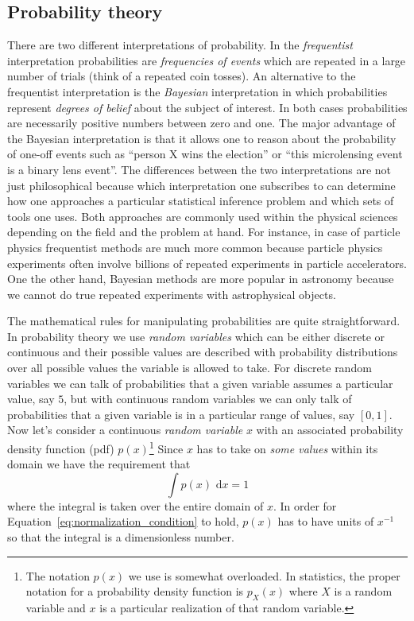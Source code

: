 \documentclass[12pt,dvipsnames]{report}
\newcommand{\ud}{\,\mathrm{d}}
\begin{document}
\subsection{Probability theory}
There are two different interpretations of probability. In the
\emph{frequentist} interpretation probabilities are \emph{frequencies of
    events} which are repeated in a large number of trials (think of a repeated
coin tosses). An alternative to the frequentist interpretation is the
\emph{Bayesian} interpretation in which probabilities represent \emph{degrees
    of belief} about the subject of interest. In both cases probabilities are
necessarily positive numbers between zero and one. The major advantage of the
Bayesian interpretation is that it allows one to reason about the probability
of one-off events such as ``person X wins the election'' or ``this microlensing
event is a binary lens event''. The differences between the two interpretations
are not just philosophical because which interpretation one subscribes to can
determine how one approaches a particular statistical inference problem and
which sets of tools one uses. Both approaches are commonly used within the
physical sciences depending on the field and the problem at hand. For instance,
in case of particle physics frequentist methods are much more common because
particle physics experiments often involve billions of repeated experiments in
particle accelerators. One the other hand, Bayesian methods are more popular in
astronomy because we cannot do true repeated experiments with astrophysical
objects.

The mathematical rules for manipulating probabilities are quite
straightforward. In probability theory we use \emph{random variables} which can
be either discrete or continuous and their possible values are described with
probability distributions over all possible values the variable is allowed to
take. For discrete random variables we can talk of probabilities that a given
variable assumes a particular value, say $5$, but with continuous random
variables we can only talk of probabilities that a given variable is in a
particular range of values, say $[0,1]$. Now let's consider a continuous
\emph{random variable} $x$ with an associated probability density function
(pdf) $p(x)$\footnote{The notation $p(x)$ we use is somewhat overloaded. In
    statistics, the proper notation for a probability density function is
    $p_{X}(x)$ where $X$ is a random variable and $x$ is a particular realization
    of that random variable.} Since $x$ has to take on \emph{some values} within
its domain we have the requirement that
\begin{equation}
    \int p(x)\,\ud x=1
    \label{eq:normalization_condition}
\end{equation}
where the integral is taken over the entire domain of $x$.
In order for Equation~\ref{eq:normalization_condition} to hold,
$p(x)$ has to have units of $x^{-1}$ so that
the integral is a dimensionless number.
\end{document}
